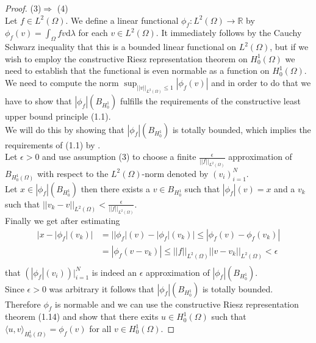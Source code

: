 \documentclass[11pt,a4paper,leqno]{report}
\numberwithin{equation}{chapter}
\begin{document}
\begin{proof}(3)$\Rightarrow$ (4)\\
Let $f\in L^2(\Omega)$. We define a linear functional $\phi_f:L^2(\Omega)\rightarrow\mathbb{R}$ by  $\phi_f(v)=\int_\Omega fv \mathrm{d}\lambda$ for each $v\in L^2(\Omega)$. It immediately follows by the Cauchy Schwarz inequality that this is a bounded linear functional on $L^2(\Omega)$, but if we wish to employ the constructive Riesz representation theorem on $H^1_0(\Omega)$ we need to establish that the functional is even normable as a function on $H^1_0(\Omega)$. We need to compute the norm $\sup_{||v||_{L^2(\Omega)}\leq 1}|\phi_f(v)|$ and in order to do that we have to show that $|\phi_f|(B_{H^1_0})$ fulfills the requirements of the constructive least upper bound principle (1.1). \\We will do this by showing that $|\phi_f|(B_{H^1_0})$ is totally bounded, which implies the requirements of (1.1) by \cite[chapter 2, corollary 4.4]{CANA}.\\
Let $\epsilon>0$ and use assumption (3) to choose a finite $\frac{\epsilon}{||f||_{L^2(\Omega)}}$ approximation of $B_{H^1_0(\Omega)}$ with respect to the $L^2(\Omega)$-norm denoted by $(v_i)_{i=1}^N$. 
\\Let $x\in|\phi_f|(B_{H^1_0})$ then there exists a $v\in B_{H^1_0}$ such that $|\phi_f|(v)=x$ and a $v_k$ such that $||v_k-v||_{L^2(\Omega)}<\frac{\epsilon}{||f||_{L^2(\Omega)}}$. \\
Finally we get after estimating
\begin{align*}
|x-|\phi_f|(v_k)|&=||\phi_f|(v)-|\phi_f|(v_k)|\leq|\phi_f(v)-\phi_f(v_k)|\\
&=|\phi_f(v-v_k)|\leq||f||_{L^2(\Omega)}||v-v_k||_{L^2(\Omega)}<\epsilon\\
\end{align*}
that $(|\phi_f|(v_i))|_{i=1}^N$ is indeed an $\epsilon$ approximation of $|\phi_f|(B_{H^1_0})$.\\ Since $\epsilon>0$ was arbitrary it follows that $|\phi_f|(B_{H^1_0})$ is totally bounded.\\
Therefore $\phi_f$ is normable and we can use the constructive Riesz representation theorem (1.14) and show that there exits $u\in H^1_0(\Omega)$ such that $\langle u, v\rangle_{H^1_0(\Omega)}=\phi_f(v)$ for all $v\in H^1_0(\Omega)$.
\end{proof}
\end{document}
